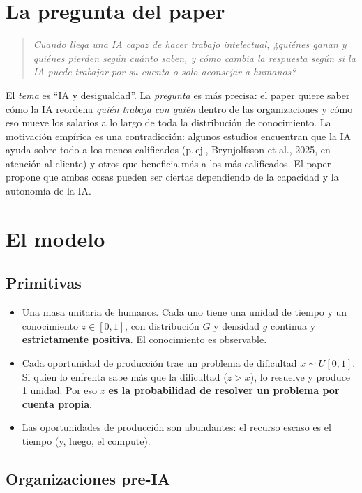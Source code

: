 \documentclass[11pt]{article}
\theoremstyle{definition}
\theoremstyle{remark}
\begin{document}
\section{La pregunta del paper}

\begin{quote}
\emph{Cuando llega una IA capaz de hacer trabajo intelectual, ¿quiénes ganan y quiénes pierden según cuánto saben, y cómo cambia la respuesta según si la IA puede trabajar por su cuenta o solo aconsejar a humanos?}
\end{quote}

El \emph{tema} es ``IA y desigualdad''. La \emph{pregunta} es más precisa: el paper quiere saber cómo la IA reordena \emph{quién trabaja con quién} dentro de las organizaciones y cómo eso mueve los salarios a lo largo de toda la distribución de conocimiento. La motivación empírica es una contradicción: algunos estudios encuentran que la IA ayuda sobre todo a los menos calificados (p.\,ej., Brynjolfsson et al., 2025, en atención al cliente) y otros que beneficia más a los más calificados. El paper propone que ambas cosas pueden ser ciertas dependiendo de la capacidad y la autonomía de la IA.

\section{El modelo}

\subsection{Primitivas}

\begin{itemize}
  \item Una masa unitaria de humanos. Cada uno tiene una unidad de tiempo y un conocimiento $z\in[0,1]$, con distribución $G$ y densidad $g$ continua y \textbf{estrictamente positiva}. El conocimiento es observable.
  \item Cada oportunidad de producción trae un problema de dificultad $x\sim U[0,1]$. Si quien lo enfrenta sabe más que la dificultad ($z>x$), lo resuelve y produce 1 unidad. Por eso \textbf{$z$ es la probabilidad de resolver un problema por cuenta propia}.
  \item Las oportunidades de producción son abundantes: el recurso escaso es el tiempo (y, luego, el compute).
\end{itemize}

\subsection{Organizaciones pre-IA}
\end{document}
